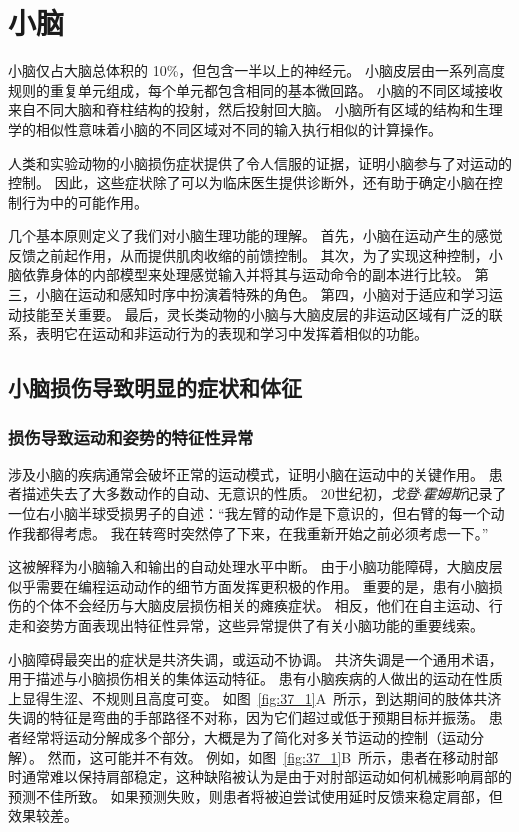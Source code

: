 \chapter{小脑} \label{chap:chap37}

小脑仅占大脑总体积的 10\%，但包含一半以上的神经元。
小脑皮层由一系列高度规则的重复单元组成，每个单元都包含相同的基本微回路。
小脑的不同区域接收来自不同大脑和脊柱结构的投射，然后投射回大脑。
小脑所有区域的结构和生理学的相似性意味着小脑的不同区域对不同的输入执行相似的计算操作。


人类和实验动物的小脑损伤症状提供了令人信服的证据，证明小脑参与了对运动的控制。
因此，这些症状除了可以为临床医生提供诊断外，还有助于确定小脑在控制行为中的可能作用。


几个基本原则定义了我们对小脑生理功能的理解。
首先，小脑在运动产生的感觉反馈之前起作用，从而提供肌肉收缩的前馈控制。
其次，为了实现这种控制，小脑依靠身体的内部模型来处理感觉输入并将其与运动命令的副本进行比较。
第三，小脑在运动和感知时序中扮演着特殊的角色。
第四，小脑对于适应和学习运动技能至关重要。
最后，灵长类动物的小脑与大脑皮层的非运动区域有广泛的联系，表明它在运动和非运动行为的表现和学习中发挥着相似的功能。


\section{小脑损伤导致明显的症状和体征}

\subsection{损伤导致运动和姿势的特征性异常}

涉及小脑的疾病通常会破坏正常的运动模式，证明小脑在运动中的关键作用。
患者描述失去了大多数动作的自动、无意识的性质。
20世纪初，\textit{戈登$\cdot$霍姆斯}记录了一位右小脑半球受损男子的自述：“我左臂的动作是下意识的，但右臂的每一个动作我都得考虑。
我在转弯时突然停了下来，在我重新开始之前必须考虑一下。”


这被解释为小脑输入和输出的自动处理水平中断。
由于小脑功能障碍，大脑皮层似乎需要在编程运动动作的细节方面发挥更积极的作用。
重要的是，患有小脑损伤的个体不会经历与大脑皮层损伤相关的瘫痪症状。
相反，他们在自主运动、行走和姿势方面表现出特征性异常，这些异常提供了有关小脑功能的重要线索。


小脑障碍最突出的症状是共济失调，或运动不协调。
共济失调是一个通用术语，用于描述与小脑损伤相关的集体运动特征。
患有小脑疾病的人做出的运动在性质上显得生涩、不规则且高度可变。 
如图~\ref{fig:37_1}A~所示，到达期间的肢体共济失调的特征是弯曲的手部路径不对称，因为它们超过或低于预期目标并振荡。
患者经常将运动分解成多个部分，大概是为了简化对多关节运动的控制（运动分解）。
然而，这可能并不有效。
例如，如图~\ref{fig:37_1}B~所示，患者在移动肘部时通常难以保持肩部稳定，这种缺陷被认为是由于对肘部运动如何机械影响肩部的预测不佳所致。
如果预测失败，则患者将被迫尝试使用延时反馈来稳定肩部，但效果较差。


